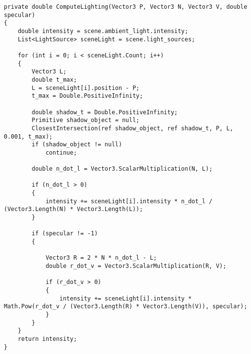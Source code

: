 \begin{lstlisting}[caption=Алгоритм Фонга]
private double ComputeLighting(Vector3 P, Vector3 N, Vector3 V, double specular)
{
	double intensity = scene.ambient_light.intensity;
	List<LightSource> sceneLight = scene.light_sources;
	
	for (int i = 0; i < sceneLight.Count; i++)
	{
		Vector3 L;
		double t_max;
		L = sceneLight[i].position - P;
		t_max = Double.PositiveInfinity;
		
		double shadow_t = Double.PositiveInfinity;
		Primitive shadow_object = null;
		ClosestIntersection(ref shadow_object, ref shadow_t, P, L, 0.001, t_max);
		if (shadow_object != null)
			continue;
		
		double n_dot_l = Vector3.ScalarMultiplication(N, L);
		
		if (n_dot_l > 0)
		{
			intensity += sceneLight[i].intensity * n_dot_l / (Vector3.Length(N) * Vector3.Length(L));
		}
		
		if (specular != -1)
		{
			
			Vector3 R = 2 * N * n_dot_l - L;
			double r_dot_v = Vector3.ScalarMultiplication(R, V);
			
			if (r_dot_v > 0)
			{
				intensity += sceneLight[i].intensity * Math.Pow(r_dot_v / (Vector3.Length(R) * Vector3.Length(V)), specular);
			}
		}
	}
	return intensity;
}
\end{lstlisting}
\clearpage


